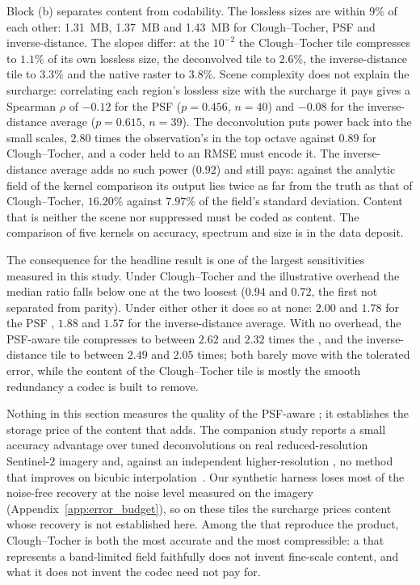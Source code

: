 Block (b) separates content from codability. The lossless sizes are
within $9\%$ of each other: \SI{1.31}{MB}, \SI{1.37}{MB} and \SI{1.43}{MB} for Clough--Tocher, PSF and inverse-distance. The slopes
differ: at the $10^{-2}$  the Clough--Tocher tile
compresses to $1.1\%$ of its own lossless size, the deconvolved tile to
$2.6\%$, the inverse-distance tile to $3.3\%$ and the native raster to
$3.8\%$. Scene complexity does not explain the surcharge: correlating
each region's lossless size with the surcharge it pays gives a Spearman
$\rho$ of $-0.12$ for the PSF  ($p=0.456$, $n=40$) and
$-0.08$ for the inverse-distance average ($p=0.615$, $n=39$). The
deconvolution puts power back into the small scales, $2.80$ times the
observation's in the top octave against $0.89$ for Clough--Tocher, and a
coder held to an RMSE must encode it. The inverse-distance average adds
no such power ($0.92$) and still pays: against the analytic field of the kernel comparison its
output lies twice as far from the truth as that of Clough--Tocher,
$16.20\%$ against $7.97\%$ of the field's standard deviation. Content
that is neither the scene nor suppressed must be coded as content. The
comparison of five kernels on accuracy, spectrum and size is in the data
deposit.

The consequence for the headline result is one of the largest
sensitivities measured in this study. Under Clough--Tocher and the illustrative overhead the median ratio
falls below one at the two loosest  ($0.94$ and $0.72$, the
first not separated from parity). Under either other  it does so
at none: $2.00$ and $1.78$ for the PSF , $1.88$ and $1.57$ for the inverse-distance average. With no overhead, the
PSF-aware tile compresses to between $2.62$ and $2.32$ times the
, and the inverse-distance tile to between $2.49$
and $2.05$ times; both barely move with the tolerated error, while the
content of the Clough--Tocher tile is mostly the smooth redundancy a
codec is built to remove.

Nothing in this section measures the quality of the PSF-aware
; it establishes the storage price of the content that
 adds. The companion study reports a small accuracy advantage over tuned
deconvolutions on real reduced-resolution Sentinel-2 imagery and,
against an independent higher-resolution , no method
that improves on bicubic interpolation~\cite{delouis2026resample}. Our
synthetic harness loses most of the noise-free recovery at the noise
level measured on the imagery (Appendix~\ref{app:error_budget}), so on
these tiles the surcharge prices content whose recovery is not
established here. Among the  that reproduce the product,
Clough--Tocher is both the most accurate and the most compressible: a
 that represents a band-limited field faithfully does not
invent fine-scale content, and what it does not invent
the codec need not pay for.
